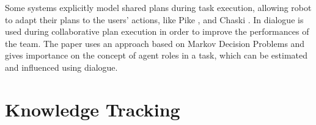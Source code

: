 \documentclass{llncs}
\begin{document}


Some systems explicitly model shared plans during task execution, allowing robot to adapt their plans to the users' actions, like Pike
\cite{levine2014concurrent,karpas2015robust}, and Chaski \cite{shah2011improved}.
In \cite{clairrobot} dialogue is used during collaborative plan execution in order to improve the performances of the team. The paper uses an approach based on Markov Decision Problems and gives importance on the concept of agent roles in a task, which can be estimated and influenced using dialogue. 













\section{Knowledge Tracking}
\end{document}
